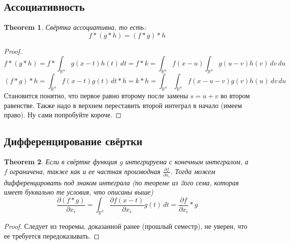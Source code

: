 \documentclass[a4paper,12pt]{article} %
\newtheorem{theorem}{Theorem}
\theoremstyle{definition}
\begin{document}
\subsection{Ассоциативность}
\begin{theorem}
	Свёртка ассоциативна, то есть:
	\begin{equation}
		f * (g * h) =  (f * g) * h
	\end{equation}
\end{theorem}
\begin{proof}
	\begin{equation}
		f * (g * h) = f * \int_{\mathbb{R}^n} g(x - t) h(t) \, dt = f * k = \int_{\mathbb{R}^n} f(x - u) \int_{\mathbb{R}^n} g(u - v) h(v) \, dv  \, du
	\end{equation}
	\begin{equation}
	(f * g) * h = \int_{\mathbb{R}^n} f(x - t) g(t) \, dt * h  = k * h = \int_{\mathbb{R}^n} \int_{\mathbb{R}^n} f(x - u - v) g(v) h(u)  \, dv  \, du
	\end{equation}
	Становится понятно, что первое равно второму после замены $s = u + v$ во втором равенстве. Также надо в верхнем переставить второй интеграл в начало (имеем право). Ну сами попробуйте короче.
\end{proof}
\subsection{Дифференцирование свёртки}
\begin{theorem}
	Если в свёртке функция $g$ интегрируема с конечным интегралом, а $f$ ограничена, также как и ее частная производная $\frac{\partial f}{\partial x_i}$. Тогда можем дифференцировать под знаком интеграла (по теореме из 2ого сема, которая имеет буквально те условия, что описаны выше)
	\begin{equation}
		\frac{\partial (f * g)}{\partial x_i} = \int_{\mathbb{R}^n} \frac{\partial f (x - t)}{\partial x_i} g(t) \, dt = \frac{\partial f}{\partial x_i} * g	
	\end{equation}
\end{theorem}
\begin{proof}
	Следует из теоремы, доказанной ранее (прошлый семестр), не уверен, что ее требуется передоказывать.
\end{proof}
\end{document}
